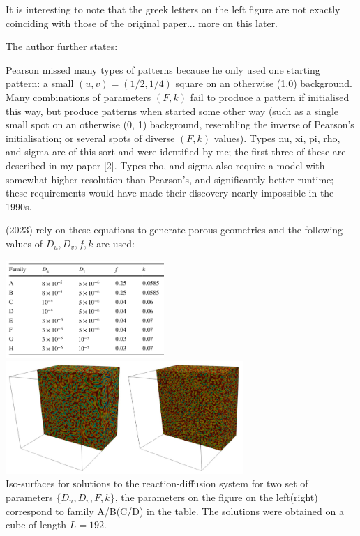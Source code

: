 It is interesting to note that the greek letters on the left figure are
not exactly coinciding with those of the original paper... more on this later.

The author further states:
\begin{displayquote}
{\color{darkgray}
Pearson missed many types of patterns because he only used one starting pattern: 
a small $(u,v)=(1/2,1/4)$ square on an otherwise (1,0) background. Many combinations 
of parameters $(F,k)$ fail to produce 
a pattern if initialised this way, but produce patterns when started some other way 
(such as a single small spot on 
an otherwise (0, 1) background, resembling the inverse of Pearson's initialisation; or several spots of
diverse $(F,k)$ values). 
Types nu, xi, pi, rho, and sigma are of this sort and were identified by me; 
the first three of these are described in my paper [2]. 
Types rho, and sigma also require a model with somewhat higher 
resolution than Pearson's, and significantly better runtime; these requirements would have made their discovery 
nearly impossible in the 1990s.
}
\end{displayquote} 




\textcite{gama23} (2023) rely on these equations to generate porous geometries 
and the following values of $D_u,D_v,f,k$ are used:

\begin{center}
\includegraphics[width=6cm]{python_codes/fieldstone_171/images/gama01}
\includegraphics[width=9cm]{python_codes/fieldstone_171/images/gama02}\\
{\captionfont Iso-surfaces for solutions to the reaction-diffusion system 
for two set of parameters $\{D_u,D_v,F,k\}$, the parameters on the figure on 
the left(right) correspond to family A/B(C/D) in the table. The solutions were
obtained on a cube of length $L=192$.}
\end{center}

